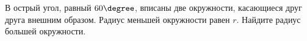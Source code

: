 \begin{ex}
	\begin{condition}
		В острый угол, равный \( 60\degree \), вписаны две окружности, касающиеся друг друга внешним образом. Радиус меньшей окружности равен \( r \). Найдите радиус большей окружности.
	\end{condition}
\end{ex}